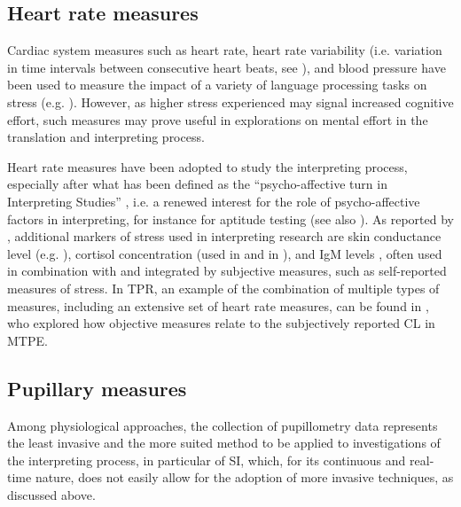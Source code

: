 \subsection{Heart rate measures} \label{heart}
Cardiac system measures such as heart rate, heart rate variability (i.e. variation in time intervals between consecutive heart beats, see \citealt{thayer_meta-analysis_2012}), and blood pressure have been used to measure the impact of a variety of language processing tasks on stress (e.g. \citealt{lambert_putting_1994,korpal_linguistic_2017,kurz_physiological_2003}). However, as higher stress experienced may signal increased cognitive effort, such measures may prove useful in explorations on mental effort in the translation and interpreting process.

Heart rate measures have been adopted to study the interpreting process, especially after what has been defined as the ``psycho-affective turn in Interpreting Studies'' \citep[298]{korpal_interpreting_2016}, i.e. a renewed interest for the role of psycho-affective factors in interpreting, for instance for aptitude testing (see also \citealt{chabasse_gibt_2009}). As reported by \citet[304]{korpal_interpreting_2016}, additional markers of stress used in interpreting research are skin conductance level (e.g. \citealt{garzone_physiological_2002,kurz_physiological_2003}), cortisol concentration (used in \citealt{blumenthal_stress_2006} and in \citealt{AIICworkload2002}), and IgM levels \citep{moser-mercer_remote_2005}, often used in combination with and integrated by subjective measures, such as self-reported measures of stress. In TPR, an example of the combination of multiple types of measures, including an extensive set of heart rate measures, can be found in \citet{herbig2021multi}, who explored how objective measures relate to the subjectively reported CL in MTPE.

\subsection{Pupillary measures} \label{pupillary_measures}
Among physiological approaches, the collection of pupillometry data represents the least invasive and the more suited method to be applied to investigations of the interpreting process, in particular of SI, which, for its continuous and real-time nature, does not easily allow for the adoption of more invasive techniques, as discussed above.

